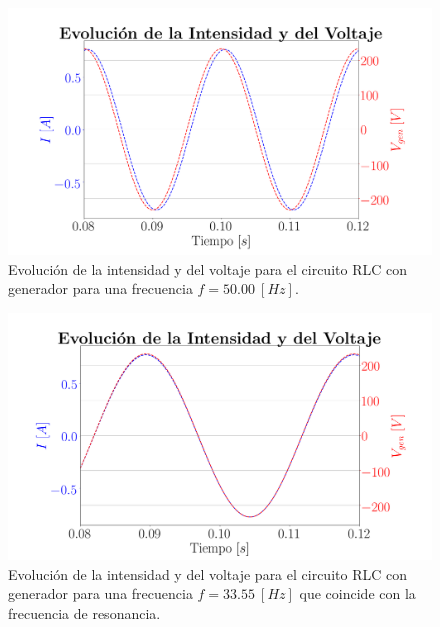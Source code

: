 \documentclass[journal]{IEEEtran}
\begin{document}
\begin{figure}[!htb]
    \centering
    \includegraphics[width=\linewidth,trim={70 0 70 55},clip]{f50.png}
    \caption{Evolución de la intensidad y del voltaje para el circuito RLC con generador para una frecuencia $f = 50.00~[Hz]$.}
    \label{fig:f50}
\end{figure}

\begin{figure}[!htb]
    \centering
    \includegraphics[width=\linewidth,trim={70 0 70 55},clip]{fres.png}
    \caption{Evolución de la intensidad y del voltaje para el circuito RLC con generador para una frecuencia $f = 33.55~[Hz]$ que coincide con la frecuencia de resonancia.}
    \label{fig:fres}
\end{figure}
\end{document}
